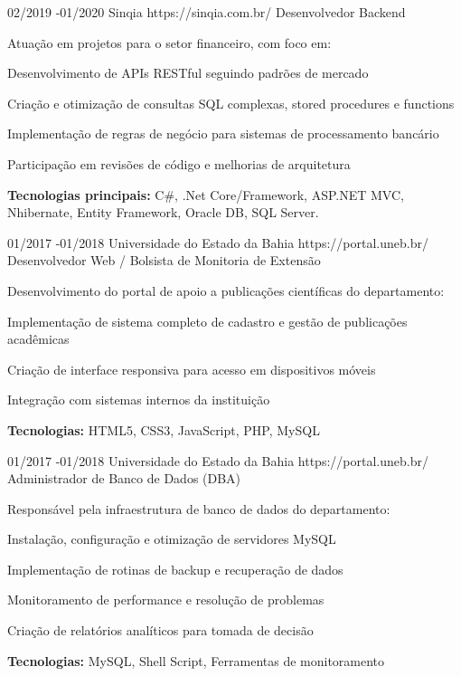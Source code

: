 \documentclass{article}
\begin{document}
\begin{job}
{02/2019 -}{01/2020}
{Sinqia}
{https://sinqia.com.br/}
{Desenvolvedor Backend}%
{Atuação em projetos para o setor financeiro, com foco em:
	\begin{itemize-noindent}
	\item Desenvolvimento de APIs RESTful seguindo padrões de mercado
	\item Criação e otimização de consultas SQL complexas, stored procedures e functions
	\item Implementação de regras de negócio para sistemas de processamento bancário
	\item Participação em revisões de código e melhorias de arquitetura
	\end{itemize-noindent}
	\rule{0mm}{5mm}\textbf{Tecnologias principais:} C\#, {.Net Core}/Framework, ASP.NET MVC, Nhibernate, Entity Framework, Oracle DB, SQL Server.}
\end{job}

\begin{job}
{01/2017 -}{01/2018}
{Universidade do Estado da Bahia}
{https://portal.uneb.br/}
{Desenvolvedor Web / Bolsista de Monitoria de Extensão}%
{Desenvolvimento do portal de apoio a publicações científicas do departamento:
	\begin{itemize-noindent}
	\item Implementação de sistema completo de cadastro e gestão de publicações acadêmicas
	\item Criação de interface responsiva para acesso em dispositivos móveis
	\item Integração com sistemas internos da instituição
	\end{itemize-noindent}
	\rule{0mm}{5mm}\textbf{Tecnologias:} HTML5, CSS3, JavaScript, PHP, MySQL}
\end{job}

\begin{job}
{01/2017 -}{01/2018}
{Universidade do Estado da Bahia}
{https://portal.uneb.br/}
{Administrador de Banco de Dados (DBA)}%
{Responsável pela infraestrutura de banco de dados do departamento:
	\begin{itemize-noindent}
	\item Instalação, configuração e otimização de servidores MySQL
	\item Implementação de rotinas de backup e recuperação de dados
	\item Monitoramento de performance e resolução de problemas
	\item Criação de relatórios analíticos para tomada de decisão
	\end{itemize-noindent}
	\rule{0mm}{5mm}\textbf{Tecnologias:} MySQL, Shell Script, Ferramentas de monitoramento}
\end{job}
\end{document}
